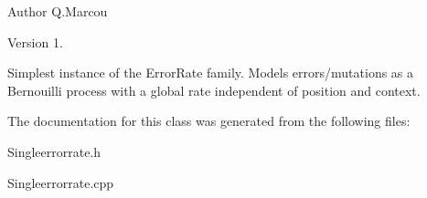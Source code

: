 \begin{DoxyAuthor}{Author}
Q.\+Marcou 
\end{DoxyAuthor}
\begin{DoxyVersion}{Version}
1.
\end{DoxyVersion}
Simplest instance of the Error\+Rate family. Models errors/mutations as a Bernouilli process with a global rate independent of position and context. 

The documentation for this class was generated from the following files\+:\begin{DoxyCompactItemize}
\item 
Singleerrorrate.\+h\item 
Singleerrorrate.\+cpp\end{DoxyCompactItemize}
